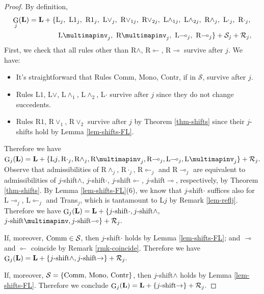 \documentclass[runningheads]{llncs}
\renewcommand{\L}{\mathbf{L}}
\DeclareMathOperator{\Glivenko}{G}
\begin{document}
\begin{proof}
By definition,
\begin{align*}
    \Glivenko_j(\L)=\L+\{
    &\textnormal{L}_j, 
    \textnormal{ L$1_j$}, \textnormal{ R$1_j$}, \textnormal{ L$\vee_j$}, \textnormal{ R$\vee_{1j}$}, \textnormal{ R$\vee_{2j}$}, \textnormal{ L$\wedge_{1j}$}, \textnormal{ L$\wedge_{2j}$}, \textnormal{ R$\wedge_j$}, \text{ L$\cdot_j$}, \textnormal{ R$\cdot_j$}, 
    \\&
    \textnormal{ L$\multimapinv_j$}, \textnormal{ R$\multimapinv_j$}, \textnormal{ L$\multimap_j$}, \textnormal{ R$\multimap_j$}%
    \}+\mathcal{S}_j+\mathcal{R}_j,
\end{align*}
First, we check that all rules other than R$\wedge$, R$\multimapinv$, R$\multimap$ survive after $j$. We have:
\begin{itemize}
    \item It's straightforward that Rules Comm, Mono, Contr, if in $\mathcal{S}$, survive after $j$.
    \item Rules L$1$, L$\vee$, L$\wedge_1$, L$\wedge_2$, L$\cdot$ survive after $j$ since they do not change succedents.
    \item Rules R$1$, R$\vee_1$, R$\vee_2$ survive after $j$ by Theorem \ref{thm-shifts} since their $j$-shifts hold by Lemma \ref{lem-shifts-FL}.
\end{itemize}
Therefore we have
$\Glivenko_j(\L)=\L+\{\textnormal{L$j$},\textnormal{R$\cdot_j$},\textnormal{R$\wedge_j$},\textnormal{R$\multimapinv_j$},\textnormal{R$\multimap_j$},\textnormal{L$\multimap_j$},\textnormal{L$\multimapinv_j$} \}+\mathcal{R}_j.$
Observe that admissibilities of \textnormal{R$\wedge_j$}, \textnormal{R$\cdot_j$}, \textnormal{R$\multimapinv_j$} and \textnormal{R$\multimap_j$} are equivalent to admissibilities of $j$-shift$\wedge$, $j$-shift$\cdot$, $j$-shift$\multimapinv$, $j$-shift$\multimap$, respectively, by Theorem \ref{thm-shifts}. 
By Lemma \ref{lem-shifts-FL}(6), we know that $j$-shift$\cdot$ suffices also for L$\multimap_j$, L$\multimapinv_j$ and Trans$_j$, which is tantamount to L$j$ by Remark \ref{lem-reflj}.
Therefore we have
$\Glivenko_j(\L)=\L+\{\textnormal{$j$-shift$\cdot$},\textnormal{$j$-shift$\wedge$},$ $\textnormal{$j$-shift$\multimapinv$},\textnormal{$j$-shift$\multimap$} \}+\mathcal{R}_j.$

If, moreover, $\textnormal{Comm}\in \mathcal{S}$, then $j$-shift$\cdot$ holds by Lemma \ref{lem-shifts-FL}; and $\multimap$ and $\multimapinv$ coincide by Remark \ref{rmk-coincide}. Therefore we have
$\Glivenko_j(\L)=\L+\{\textnormal{$j$-shift$\wedge$},\textnormal{$j$-shift$\to$} \}+\mathcal{R}_j.$

If, moreover, $\mathcal{S}=\{\textnormal{Comm, Mono, Contr}\}$, then $j$-shift$\wedge$ holds by Lemma \ref{lem-shifts-FL}. Therefore we conclude
$\Glivenko_j(\L)=\L+\{\textnormal{$j$-shift$\to$} \}+\mathcal{R}_j.$
\end{proof}
\end{document}
